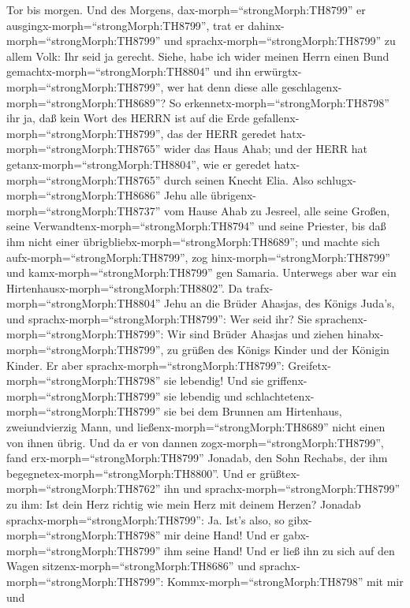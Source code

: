 Tor bis morgen.  Und des Morgens,
dax-morph=``strongMorph:TH8799'' er
ausgingx-morph=``strongMorph:TH8799'', trat er
dahinx-morph=``strongMorph:TH8799'' und
sprachx-morph=``strongMorph:TH8799'' zu allem Volk: Ihr seid ja gerecht.
Siehe, habe ich wider meinen Herrn einen Bund
gemachtx-morph=``strongMorph:TH8804'' und ihn
erwürgtx-morph=``strongMorph:TH8799'', wer hat denn diese alle
geschlagenx-morph=``strongMorph:TH8689''?  So
erkennetx-morph=``strongMorph:TH8798'' ihr ja, daß kein Wort des HERRN
ist auf die Erde gefallenx-morph=``strongMorph:TH8799'', das der HERR
geredet hatx-morph=``strongMorph:TH8765'' wider das Haus Ahab; und der
HERR hat getanx-morph=``strongMorph:TH8804'', wie er geredet
hatx-morph=``strongMorph:TH8765'' durch seinen Knecht Elia.
 Also schlugx-morph=``strongMorph:TH8686'' Jehu alle
übrigenx-morph=``strongMorph:TH8737'' vom Hause Ahab zu Jesreel, alle
seine Großen, seine Verwandtenx-morph=``strongMorph:TH8794'' und seine
Priester, bis daß ihm nicht einer
übrigbliebx-morph=``strongMorph:TH8689'';  und machte sich
aufx-morph=``strongMorph:TH8799'', zog hinx-morph=``strongMorph:TH8799''
und kamx-morph=``strongMorph:TH8799'' gen Samaria. Unterwegs aber war
ein Hirtenhausx-morph=``strongMorph:TH8802''.  Da
trafx-morph=``strongMorph:TH8804'' Jehu an die Brüder Ahasjas, des
Königs Juda's, und sprachx-morph=``strongMorph:TH8799'': Wer seid ihr?
Sie sprachenx-morph=``strongMorph:TH8799'': Wir sind Brüder Ahasjas und
ziehen hinabx-morph=``strongMorph:TH8799'', zu grüßen des Königs Kinder
und der Königin Kinder.  Er aber
sprachx-morph=``strongMorph:TH8799'':
Greifetx-morph=``strongMorph:TH8798'' sie lebendig! Und sie
griffenx-morph=``strongMorph:TH8799'' sie lebendig und
schlachtetenx-morph=``strongMorph:TH8799'' sie bei dem Brunnen am
Hirtenhaus, zweiundvierzig Mann, und
ließenx-morph=``strongMorph:TH8689'' nicht einen von ihnen übrig.
 Und da er von dannen zogx-morph=``strongMorph:TH8799'',
fand erx-morph=``strongMorph:TH8799'' Jonadab, den Sohn Rechabs, der ihm
begegnetex-morph=``strongMorph:TH8800''. Und er
grüßtex-morph=``strongMorph:TH8762'' ihn und
sprachx-morph=``strongMorph:TH8799'' zu ihm: Ist dein Herz richtig wie
mein Herz mit deinem Herzen? Jonadab
sprachx-morph=``strongMorph:TH8799'': Ja. Ist's also, so
gibx-morph=``strongMorph:TH8798'' mir deine Hand! Und er
gabx-morph=``strongMorph:TH8799'' ihm seine Hand! Und er ließ ihn zu
sich auf den Wagen sitzenx-morph=``strongMorph:TH8686'' 
und sprachx-morph=``strongMorph:TH8799'':
Kommx-morph=``strongMorph:TH8798'' mit mir und
